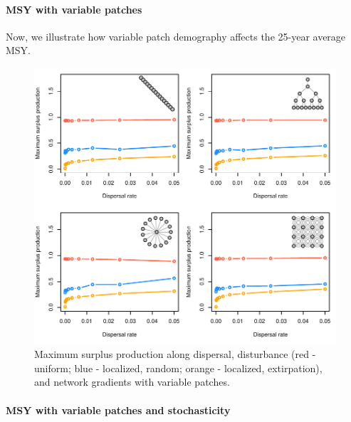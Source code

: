 \documentclass[
]{article}
\begin{document}
\newpage

\hypertarget{msy-with-variable-patches}{%
\paragraph{MSY with variable patches}\label{msy-with-variable-patches}}

Now, we illustrate how variable patch demography affects the 25-year
average MSY.

\begin{figure}[H]

{\centering \includegraphics{Managing_for_ecological_surprises_in_metapopulations_files/figure-latex/MSY with variable patches-1} 

}

\caption{Maximum surplus production along dispersal, disturbance (red - uniform; blue - localized, random; orange - localized, extirpation), and network gradients with variable patches.}\label{fig:MSY with variable patches}
\end{figure}
\newpage

\hypertarget{msy-with-variable-patches-and-stochasticity}{%
\paragraph{MSY with variable patches and
stochasticity}\label{msy-with-variable-patches-and-stochasticity}}
\end{document}
